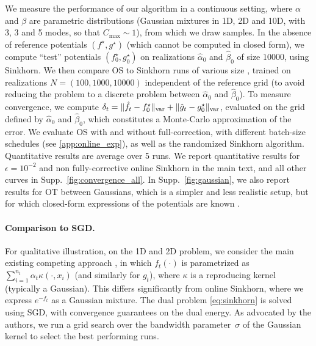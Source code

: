 We measure the performance of our algorithm in a
 continuous setting, where $\alpha$ and $\beta$ are  parametric
distributions (Gaussian mixtures in 1D, 2D and 10D, with 3, 3 and 5 modes, so
that $C_{\max} \sim 1$), from which we draw samples. In the absence of reference
potentials $(f^\star, g^\star)$ (which cannot be computed in closed form),
we compute ``test'' potentials $(f^\star_0, g^\star_0)$ on realizations $\hat
\alpha_0$ and $\hat \beta_0$ of size $10000$, using Sinkhorn. We then compare
OS to Sinkhorn runs of various size , trained on realizations $N=(100,1000,
10000)$ independent of the reference grid (to avoid reducing the problem to a
discrete problem between $\hat \alpha_0$ and $\hat \beta_0$). To measure
convergence, we compute $\delta_t = \Vert \hat f_t - f^\star_0 \Vert_{\text{\upshape var}} +           
\Vert \hat g_t -  g_0^\star \Vert_{\text{\upshape var}}$, evaluated on the grid defined by
$\hat \alpha_0$ and $\hat \beta_0$, which constitutes a Monte-Carlo approximation of the error.
%
We evaluate OS with and without full-correction, with
different batch-size schedules (see \autoref{app:online_exp}), as well as the randomized Sinkhorn algorithm. Quantitative results are average over 5 runs. We report quantitative results for $\epsilon = 10^{-2}$ and non fully-corrective online Sinkhorn in the main text, and all other curves in Supp.~\autoref{fig:convergence_all}. In
Supp.~\autoref{fig:gaussian}, we also report results for OT between Gaussians, which is a simpler and less realistic setup, but for which closed-form expressions of the potentials are known \cite{janati_entropic_2020}.

\paragraph{Comparison to SGD.}\label{sec:compare}
%
For qualitative illustration, on the 1D and 2D problem, we consider the main existing competing
approach \citep{2016-genevay-nips}, in which $f_t(\cdot)$ is parametrized as
$\sum_{i=1}^{n_t} \alpha_t \kappa(\cdot, x_i)$ (and similarly for $g_t$), where
$\kappa$ is a reproducing kernel (typically a Gaussian). This differs
significantly from online Sinkhorn, where we express $e^{-f_t}$ as a Gaussian
mixture. The dual problem \eqref{eq:sinkhorn} is solved using SGD, with convergence guarantees on the dual energy.  As advocated
by the authors, we run a grid search over the bandwidth parameter~$\sigma$ of
the Gaussian kernel to select the best performing runs.


